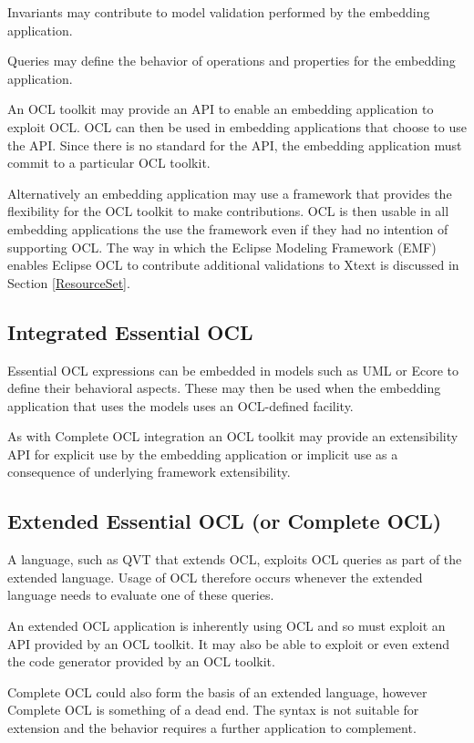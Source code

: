 \documentclass[a4paper]{article}
\begin{document}
Invariants may contribute to model validation performed by the embedding application.

Queries may define the behavior of operations and properties for the embedding application.

An OCL toolkit may provide an API to enable an embedding application to exploit OCL. OCL can then be used in embedding applications that choose to use the API. Since there is no standard for the API, the embedding application must commit to a particular OCL toolkit.

Alternatively an embedding application may use a framework that provides the flexibility for the OCL toolkit to make contributions. OCL is then usable in all embedding applications the use the framework even if they had no intention of supporting OCL. The way in which the Eclipse Modeling Framework (EMF)  enables Eclipse OCL to contribute additional validations to Xtext is discussed in Section \ref{ResourceSet}.

\subsection{Integrated Essential OCL}

Essential OCL expressions can be embedded in models such as UML or Ecore to define their behavioral aspects. These may then be used when the embedding application that uses the models uses an OCL-defined facility.

As with Complete OCL integration an OCL toolkit may provide an extensibility API for explicit use by the embedding application or implicit use as a consequence of underlying framework extensibility.

\subsection{Extended Essential OCL (or Complete OCL)}

A language, such as QVT that extends OCL, exploits OCL queries as  part of the extended language. Usage of OCL therefore occurs whenever the extended language needs to evaluate one of these queries.

An extended OCL application is inherently using OCL and so must exploit an API provided by an OCL toolkit. It may also be able to exploit or even extend the code generator provided by an OCL toolkit.

Complete OCL could also form the basis of an extended language, however Complete OCL is something of a dead end. The syntax is not suitable for extension and the behavior requires a further application to complement.
\end{document}
